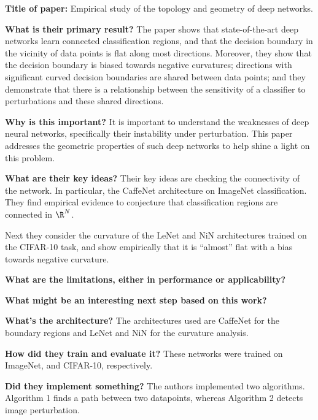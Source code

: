 \noindent \textbf{Title of paper: } Empirical study of the topology and
geometry of deep networks.

\noindent\textbf{What is their primary result?}  The paper shows that
state-of-the-art deep networks learn connected classification regions, and that
the decision boundary in the vicinity of data points is flat along most
directions. Moreover, they show that the decision boundary is biased towards
negative curvatures; directions with significant curved decision boundaries are
shared between data points; and they demonstrate that there is a relationship
between the sensitivity of a classifier to perturbations and these shared
directions.
 
\noindent\textbf{Why is this important?} It is important to understand
the weaknesses of deep neural networks, specifically their instability under
perturbation. This paper addresses the geometric properties of such deep
networks to help shine a light on this problem.

\noindent\textbf{What are their key ideas?} Their key ideas are checking
the connectivity of the network. In particular, the CaffeNet architecture on
ImageNet classification. They find empirical evidence to conjecture that
classification regions are connected in $\R^N$.

Next they consider the curvature of the LeNet and NiN architectures trained on
the CIFAR-10 task, and show empirically that it is ``almost'' flat with a bias
towards negative curvature.

\noindent\textbf{What are the limitations, either in performance or applicability?}

\noindent\textbf{What might be an interesting next step based on this work?}

\noindent\textbf{What's the architecture?} The architectures used are
CaffeNet for the boundary regions and LeNet and NiN for the curvature analysis.

\noindent\textbf{How did they train and evaluate it?} These networks were
trained on ImageNet, and CIFAR-10, respectively.

\noindent\textbf{Did they implement something?} The authors implemented
two algorithms. Algorithm 1 finds a path between two datapoints, whereas
Algorithm 2 detects image perturbation.

